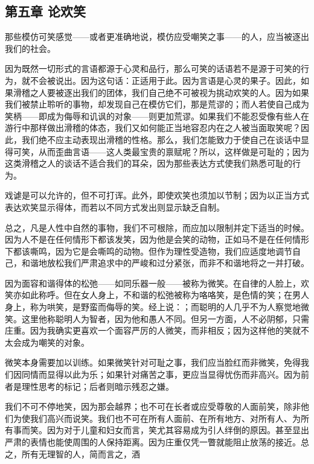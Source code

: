 \subsection{第五章 论欢笑}

那些模仿可笑感觉——或者更准确地说，模仿应受嘲笑之事——的人，应当被逐出我们的社会。\par

因为既然一切形式的言语都源于心灵和品行，那么可笑的话语若不是源于可笑的行为，就不会被说出。因为这句话：正适用于此。因为言语是心灵的果子。因此，如果滑稽之人要被逐出我们的团体，我们自己绝不可被视为挑动欢笑的人。因为如果我们被禁止聆听的事物，却发现自己在模仿它们，那是荒谬的；而人若使自己成为笑柄——即成为侮辱和讥讽的对象——则更加荒谬。如果我们不能忍受像有些人在游行中那样做出滑稽的体态，我们又如何能正当地容忍内在之人被当面取笑呢？因此，我们绝不应主动表现出滑稽的性格。那么，我们怎能致力于使自己在谈话中显得可笑，从而歪曲言语——这人类最宝贵的禀赋呢？所以，这样做是可耻的；因为这类滑稽之人的谈话不适合我们的耳朵，因为那些表达方式使我们熟悉可耻的行为。\par

戏谑是可以允许的，但不可打诨。此外，即使欢笑也须加以节制；因为以正当方式表达欢笑显示得体，而若以不同方式发出则显示缺乏自制。\par

总之，凡是人性中自然的事物，我们不可根除，而应加以限制并定下适当的时候。因为人不是在任何情形下都该发笑，因为他是会笑的动物，正如马不是在任何情形下都该嘶鸣，因为它是会嘶鸣的动物。但作为理性受造物，我们应适度地调节自己，和谐地放松我们严肃追求中的严峻和过分紧张，而非不和谐地将之一并打破。\par

因为面容和谐得体的松弛——如同乐器一般——被称为微笑。在自律的人脸上，欢笑亦如此称呼。但在女人身上，不和谐的松弛被称为咯咯笑，是色情的笑；在男人身上，称为哄笑，是野蛮而侮辱的笑。经上说：；而聪明的人几乎不为人察觉地微笑。这里他称聪明人为智者，因为他和愚人不同。但另一方面，人不必阴郁，只需庄重。因为我确实更喜欢一个面容严厉的人微笑，而非相反；因为这样他的笑就不太会成为嘲笑的对象。\par

微笑本身需要加以训练。如果微笑针对可耻之事，我们应当脸红而非微笑，免得我们因同情而显得以此为乐；如果针对痛苦之事，更应当显得忧伤而非高兴。因为前者是理性思考的标记；后者则暗示残忍之嫌。\par

我们不可不停地笑，因为那会越界；也不可在长者或应受尊敬的人面前笑，除非他们为使我们高兴而说笑。我们也不可在所有人面前、在所有地方、对所有人、为所有事而笑。因为对于儿童和妇女而言，笑尤其容易成为引人绊倒的原因。甚至显出严肃的表情也能使周围的人保持距离。因为庄重仅凭一瞥就能阻止放荡的接近。总之，所有无理智的人，简而言之，酒\par

